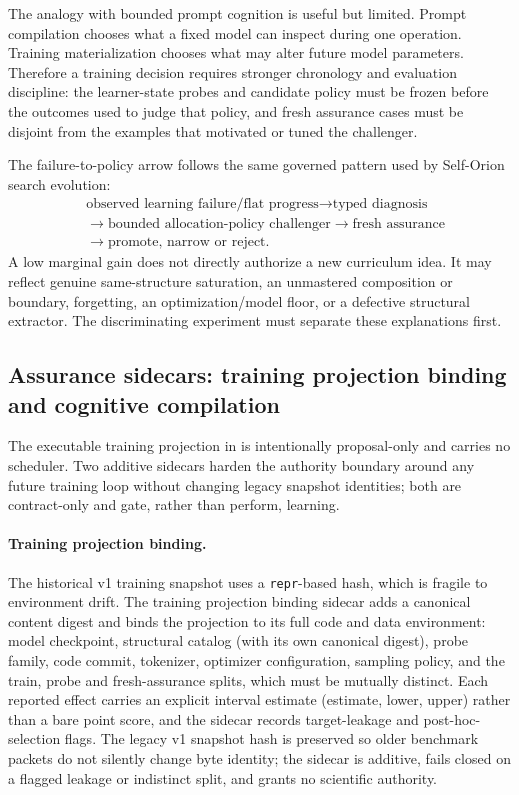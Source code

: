 The analogy with bounded prompt cognition is useful but limited.  Prompt compilation chooses what a fixed model can inspect during one operation.  Training materialization chooses what may alter future model parameters.  Therefore a training decision requires stronger chronology and evaluation discipline: the learner-state probes and candidate policy must be frozen before the outcomes used to judge that policy, and fresh assurance cases must be disjoint from the examples that motivated or tuned the challenger.

The failure-to-policy arrow follows the same governed pattern used by Self-Orion search evolution:
\[
\begin{aligned}
&\text{observed learning failure/flat progress}
\rightarrow \text{typed diagnosis} \\
&\rightarrow \text{bounded allocation-policy challenger}
\rightarrow \text{fresh assurance} \\
&\rightarrow \text{promote, narrow or reject}.
\end{aligned}
\]
A low marginal gain does not directly authorize a new curriculum idea.  It may reflect genuine same-structure saturation, an unmastered composition or boundary, forgetting, an optimization/model floor, or a defective structural extractor.  The discriminating experiment must separate these explanations first.

\subsection{Assurance sidecars: training projection binding and cognitive compilation}
\label{sec:training_assurance_sidecars}

The executable training projection in  is intentionally proposal-only and carries no scheduler. Two additive sidecars harden the authority boundary around any future training loop without changing legacy snapshot identities; both are contract-only and gate, rather than perform, learning.

\paragraph{Training projection binding.}
The historical v1 training snapshot uses a \texttt{repr}-based hash, which is fragile to environment drift. The training projection binding sidecar adds a canonical content digest and binds the projection to its full code and data environment: model checkpoint, structural catalog (with its own canonical digest), probe family, code commit, tokenizer, optimizer configuration, sampling policy, and the train, probe and fresh-assurance splits, which must be mutually distinct. Each reported effect carries an explicit interval estimate (estimate, lower, upper) rather than a bare point score, and the sidecar records target-leakage and post-hoc-selection flags. The legacy v1 snapshot hash is preserved so older benchmark packets do not silently change byte identity; the sidecar is additive, fails closed on a flagged leakage or indistinct split, and grants no scientific authority.

